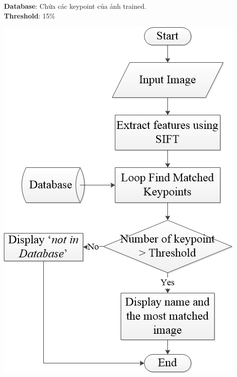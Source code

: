 \documentclass[landscape,a0paper,fontscale=0.285]{baposter} %
\begin{document}
\begin{poster}
{\textbf{Database}: Chứa các keypoint của ảnh trained.\\

\textbf{Threshold}: 15$\%$\\



\begin{center}
\includegraphics[width=1\linewidth]{thuatoan}
\end{center}


}


\end{poster}
\end{document}
